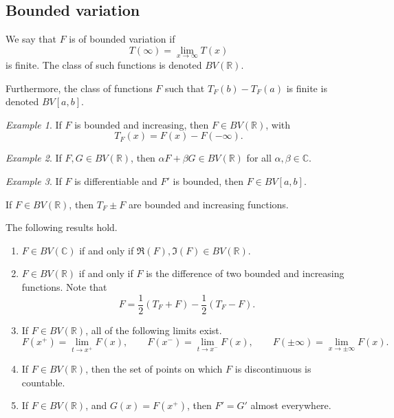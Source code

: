 \documentclass[11pt]{article}
\newcommand{\C}{\mathbb{C}}
\newcommand{\R}{\mathbb{R}}
\theoremstyle{definition}
\theoremstyle{remark}
\newtheorem*{example}{Example}
\begin{document}
    \subsection{Bounded variation}

    \begin{definition}
        We say that $F$ is of bounded variation if \[
            T(\infty) = \lim_{x \to \infty} T(x)
        \] is finite. The class of such functions is denoted $BV(\R)$.

        Furthermore, the class of functions $F$ such that $T_F(b) - T_F(a)$ is finite
        is denoted $BV[a, b]$.
    \end{definition}

    \begin{example}
        If $F$ is bounded and increasing, then $F \in BV(\R)$, with \[
            T_F(x) = F(x) - F(-\infty).
        \]
    \end{example}
    \begin{example}
        If $F, G \in BV(\R)$, then $\alpha F + \beta G \in BV(\R)$ for all $\alpha,
        \beta \in \C$.
    \end{example}
    \begin{example}
        If $F$ is differentiable and $F'$ is bounded, then $F \in BV[a, b]$.
    \end{example}

    \begin{lemma}
        If $F \in BV(\R)$, then $T_F \pm F$ are bounded and increasing functions.
    \end{lemma}

    \begin{theorem}
        The following results hold.
        \begin{enumerate}
            \item $F \in BV(\C)$ if and only if $\Re(F), \Im(F) \in BV(\R)$.
            \item $F \in BV(\R)$ if and only if $F$ is the difference of two bounded
            and increasing functions. Note that \[
                F = \frac{1}{2}(T_F + F) - \frac{1}{2}(T_F - F).
            \]
            \item If $F \in BV(\R)$, all of the following limits exist. \[
                F(x^+) = \lim_{t \to x^+} F(x), \qquad
                F(x^-) = \lim_{t \to x^-} F(x), \qquad
                F(\pm\infty) = \lim_{x \to \pm\infty} F(x).
            \]
            \item If $F \in BV(\R)$, then the set of points on which $F$ is
            discontinuous is countable.
            \item If $F \in BV(\R)$, and $G(x) = F(x^+)$, then $F' = G'$ almost
            everywhere.
        \end{enumerate}
    \end{theorem}
\end{document}

